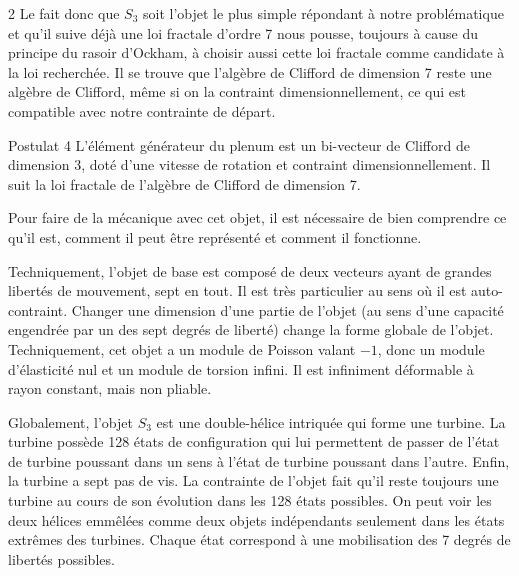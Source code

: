 \begin{multicols}{2}
Le fait donc que $S_3$ soit l'objet le plus simple répondant à
notre problématique et qu'il suive déjà une loi fractale d'ordre 7 nous
pousse, toujours à cause du principe du rasoir d'Ockham, à choisir aussi cette loi
fractale comme candidate à la loi recherchée. Il se trouve que
l'algèbre de Clifford de dimension 7 reste une algèbre de Clifford,
même si on la contraint dimensionnellement, ce qui est compatible avec
notre contrainte de départ.

\begin{mybox}[breakable,colback=blue!10, colbacktitle=pkcolor]{Postulat 4}
L'élément générateur du plenum est un bi-vecteur de Clifford de
dimension 3, doté d'une vitesse de rotation et contraint
dimensionnellement. Il suit la loi fractale de l'algèbre de
Clifford de dimension 7.
\end{mybox}
\medskip

Pour faire de la mécanique avec cet objet, il est nécessaire de bien
comprendre ce qu'il est, comment il peut être représenté et comment il
fonctionne.

Techniquement, l'objet de base est composé de deux vecteurs ayant de
grandes libertés de mouvement, sept en tout. Il est très particulier
au sens où il est auto-contraint. Changer une dimension d'une partie
de l'objet (au sens d'une capacité engendrée par un des sept degrés de liberté)
change la forme globale de l'objet. Techniquement, cet objet a un module de Poisson valant $-1$, donc un module d'élasticité nul et un module de torsion infini. Il est infiniment déformable à rayon constant, mais non pliable.

Globalement, l'objet $S_3$ est une double-hélice intriquée qui forme une
turbine. La turbine possède 128 états de configuration qui lui
permettent de passer de l'état de turbine poussant dans un sens à
l'état de turbine poussant dans l'autre. Enfin, la turbine a sept
pas de vis. La contrainte de l'objet fait qu'il reste toujours une
turbine au cours de son évolution dans les 128 états possibles. On
peut voir les deux hélices emmêlées comme deux objets indépendants
seulement dans les états extrêmes des turbines. Chaque état
correspond à une mobilisation des 7 degrés de libertés possibles.
\end{multicols}

